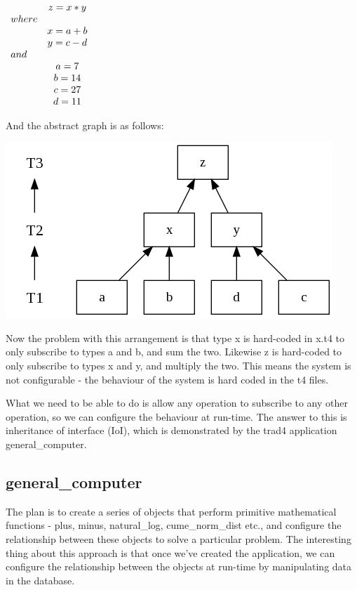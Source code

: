 \documentclass{report}
\begin{document}
\begin{math}
  \begin{array}{ l c }
        & z = x * y   \\
        where         \\
        & x = a + b   \\
        & y = c - d   \\
        and           \\
        & a = 7       \\
        & b = 14      \\
        & c = 27      \\
        & d = 11      \\
  \end{array}
\end{math}

And the abstract graph is as follows:

\includegraphics[scale=0.5]{simplemathsabstract.png}

Now the problem with this arrangement is that type x is hard-coded in x.t4 to only subscribe to types a and b, and sum the two. Likewise z is hard-coded to only subscribe to types x and y, and multiply the two. This means the system is not configurable - the behaviour of the system is hard coded in the t4 files.

What we need to be able to do is allow any operation to subscribe to any other operation, so we can configure the behaviour at run-time. The answer to this is inheritance of interface (IoI), which is demonstrated by the trad4 application general_computer.

\subsection{general_computer}

The plan is to create a series of objects that perform primitive mathematical functions - plus, minus, natural_log, cume_norm_dist etc., and configure the relationship between these objects to solve a particular problem. The interesting thing about this approach is that once we've created the application, we can configure the relationship between the objects at run-time by manipulating data in the database. 
\end{document}
